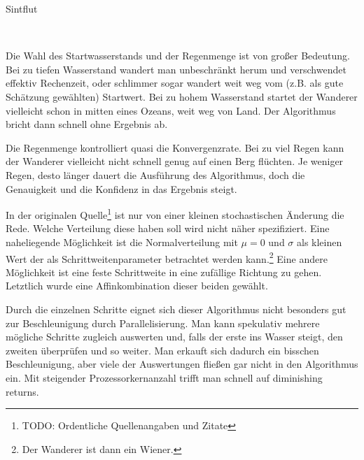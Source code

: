 \documentclass[a4paper,12pt]{article}
\begin{document}
\begin{algorithm}
\caption{Sintflut}
\begin{algorithmic}
\\



\EndFunction	
\end{algorithmic}
\end{algorithm}

Die Wahl des Startwasserstands und der Regenmenge ist von großer Bedeutung. Bei zu tiefen Wasserstand wandert man unbeschränkt herum und verschwendet effektiv Rechenzeit, oder schlimmer sogar wandert weit weg vom (z.B. als gute Schätzung gewählten) Startwert. Bei zu hohem Wasserstand startet der Wanderer vielleicht schon in mitten eines Ozeans, weit weg von Land. Der Algorithmus bricht dann schnell ohne Ergebnis ab.

Die Regenmenge kontrolliert quasi die Konvergenzrate. Bei zu viel Regen kann der Wanderer vielleicht nicht schnell genug auf einen Berg flüchten. Je weniger Regen, desto länger dauert die Ausführung des Algorithmus, doch die Genauigkeit und die Konfidenz in das Ergebnis steigt.

In der originalen Quelle\footnote{TODO: Ordentliche Quellenangaben und Zitate} ist nur von einer kleinen stochastischen Änderung die Rede. Welche Verteilung diese haben soll wird nicht näher spezifiziert. Eine naheliegende Möglichkeit ist die Normalverteilung mit $\mu = 0$ und $\sigma$ als kleinen Wert der als Schrittweitenparameter betrachtet werden kann.\footnote{Der Wanderer ist dann ein Wiener.} Eine andere Möglichkeit ist eine feste Schrittweite in eine zufällige Richtung zu gehen. Letztlich wurde eine Affinkombination dieser beiden gewählt. 


Durch die einzelnen Schritte eignet sich dieser Algorithmus nicht besonders gut zur Beschleunigung durch Parallelisierung. Man kann spekulativ mehrere mögliche Schritte zugleich auswerten und, falls der erste ins Wasser steigt, den zweiten überprüfen und so weiter. Man erkauft sich dadurch ein bisschen Beschleunigung, aber viele der Auswertungen fließen gar nicht in den Algorithmus ein. Mit steigender Prozessorkernanzahl trifft man schnell auf diminishing returns. 
\end{document}
